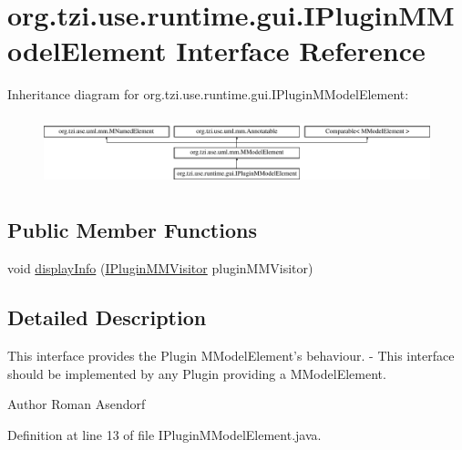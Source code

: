 \hypertarget{interfaceorg_1_1tzi_1_1use_1_1runtime_1_1gui_1_1_i_plugin_m_model_element}{\section{org.\-tzi.\-use.\-runtime.\-gui.\-I\-Plugin\-M\-Model\-Element Interface Reference}
\label{interfaceorg_1_1tzi_1_1use_1_1runtime_1_1gui_1_1_i_plugin_m_model_element}
}
Inheritance diagram for org.\-tzi.\-use.\-runtime.\-gui.\-I\-Plugin\-M\-Model\-Element\-:\begin{figure}[H]
\begin{center}
\leavevmode
\includegraphics[height=2.021661cm]{interfaceorg_1_1tzi_1_1use_1_1runtime_1_1gui_1_1_i_plugin_m_model_element}
\end{center}
\end{figure}
\subsection*{Public Member Functions}
\begin{DoxyCompactItemize}
\item 
void \hyperlink{interfaceorg_1_1tzi_1_1use_1_1runtime_1_1gui_1_1_i_plugin_m_model_element_a3ff03a0f849014a06ea771733ef74cc4}{display\-Info} (\hyperlink{interfaceorg_1_1tzi_1_1use_1_1gui_1_1main_1_1runtime_1_1_i_plugin_m_m_visitor}{I\-Plugin\-M\-M\-Visitor} plugin\-M\-M\-Visitor)
\end{DoxyCompactItemize}


\subsection{Detailed Description}
This interface provides the Plugin M\-Model\-Element's behaviour. -\/ This interface should be implemented by any Plugin providing a M\-Model\-Element.

\begin{DoxyAuthor}{Author}
Roman Asendorf 
\end{DoxyAuthor}


Definition at line 13 of file I\-Plugin\-M\-Model\-Element.\-java.



